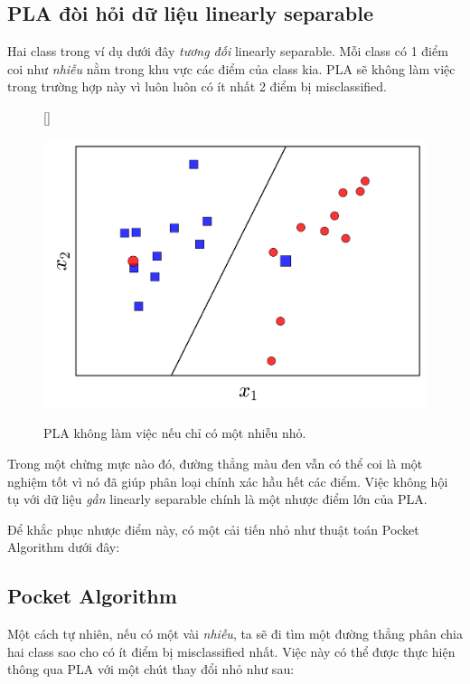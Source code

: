  
\subsection{PLA đòi hỏi dữ liệu linearly separable}
 
Hai class trong ví dụ dưới đây \textit{tương đối} linearly separable. Mỗi class có 1 điểm coi như \textit{nhiễu} nằm trong khu vực các điểm của class kia. PLA sẽ không làm việc trong trường hợp này vì luôn luôn có ít nhất 2 điểm bị misclassified.  
 

\begin{figure}[t]
     [\FBwidth]
     {\caption{ 
     PLA không làm việc nếu chỉ có một nhiễu nhỏ.
     }
     \label{fig:9_7}}
     { %
     \includegraphics[width=.5\textwidth]{Chapters/05_NeuralNetworks/09_perceptron/pla7.png}
     }
 \end{figure}

 
Trong một chừng mực nào đó, đường thẳng màu đen vẫn có thể coi là một nghiệm tốt vì nó đã giúp phân loại chính xác hầu hết các điểm. Việc không hội tụ với dữ liệu \textit{gần} linearly separable chính là một nhược điểm lớn của PLA. 
 
Để khắc phục nhược điểm này, có một cải tiến nhỏ như thuật toán Pocket Algorithm dưới đây: 
 
\subsection{Pocket Algorithm}
Một cách tự nhiên, nếu có một vài \textit{nhiễu}, ta sẽ đi tìm một đường thẳng phân chia hai class sao cho có ít điểm bị misclassified nhất. Việc này có thể được thực hiện thông qua PLA với một chút thay đổi nhỏ như sau: 

